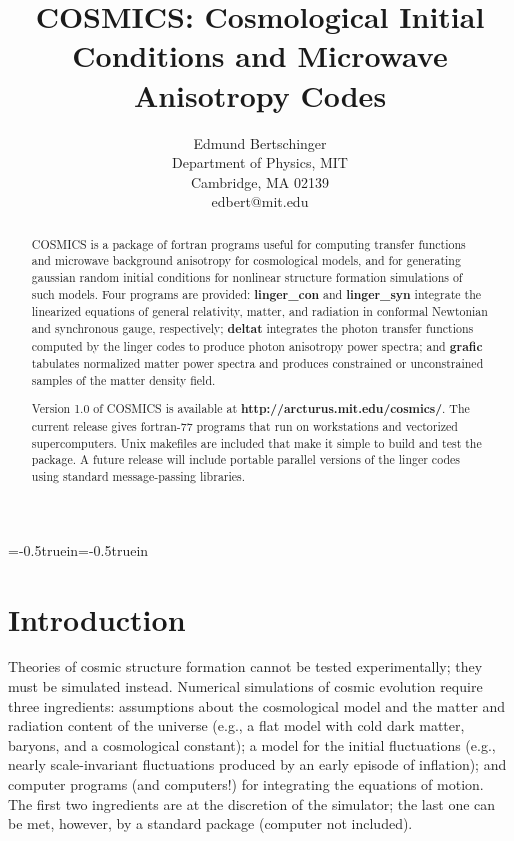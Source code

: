 \voffset=-0.5truein\hoffset=-0.5truein\textwidth=450pt
\baselineskip



\title{COSMICS: Cosmological Initial Conditions and Microwave Anisotropy Codes}

\author{Edmund Bertschinger\\
	Department of Physics, MIT\\
	Cambridge, MA 02139\\
 edbert@mit.edu}

\maketitle

\begin{abstract}
COSMICS is a package of fortran programs useful for computing transfer
functions and microwave background anisotropy for cosmological models,
and for generating gaussian random initial conditions for nonlinear
structure formation simulations of such models.  Four programs are
provided: {\bf linger\_con} and {\bf linger\_syn} integrate the linearized
equations of general relativity, matter, and radiation in conformal
Newtonian and synchronous gauge, respectively; {\bf deltat}
integrates the photon transfer functions computed by the linger
codes to produce photon anisotropy power spectra; and {\bf grafic}
tabulates normalized matter power spectra and produces constrained
or unconstrained samples of the matter density field.

Version 1.0 of COSMICS is available at {\bf http://arcturus.mit.edu/cosmics/}.
The current release gives fortran-77 programs that run on workstations and
vectorized supercomputers.  Unix makefiles are included that make it simple
to build and test the package. A future release will include portable parallel
versions of the linger codes using standard message-passing libraries.
\end{abstract}


\section{Introduction}

Theories of cosmic structure formation cannot be tested experimentally;
they must be simulated instead.  Numerical simulations of cosmic evolution
require three ingredients: assumptions about the cosmological model and
the matter and radiation content of the universe (e.g., a flat model
with cold dark matter, baryons, and a cosmological constant); a model for
the initial fluctuations (e.g., nearly scale-invariant fluctuations produced
by an early episode of inflation); and computer programs (and computers!)
for integrating the equations of motion.  The first two ingredients are at
the discretion of the simulator; the last one can be met, however, by
a standard package (computer not included).

